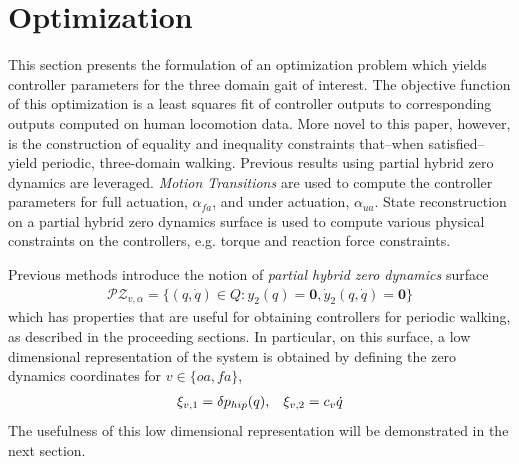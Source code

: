 \section{Optimization}
\label{sec:optimization}

This section presents the formulation of an optimization problem which yields controller parameters for the three domain gait of interest. The objective function of this optimization is a least squares fit of controller outputs to corresponding outputs computed on human locomotion data. More novel to this paper, however, is the construction of equality and inequality constraints that--when satisfied--yield periodic, three-domain walking. Previous results using partial hybrid zero dynamics are leveraged.  \textit{Motion Transitions} \cite{PHA2013} are used to compute the controller parameters for full actuation, $\alpha_{fa}$, and under actuation, $\alpha_{ua}$. State reconstruction on a partial hybrid zero dynamics surface \cite{WGK03} is used to compute various physical constraints on the controllers, e.g. torque and reaction force constraints.


Previous methods introduce the notion of \textit{partial hybrid zero dynamics} surface
\begin{align}
\label{PZD}
\mathcal{PZ}_{v,\alpha} = \{(q,\dot{q}) \in Q : y_{2}(q) = \mathbf{0}, \dot{y}_{2}(q,\dot{q}) = \mathbf{0}\}
\end{align}
which has properties that are useful for obtaining controllers for periodic walking, as described in the proceeding sections. In particular, on this surface, a low dimensional representation of the system is obtained by defining the zero dynamics coordinates for $v \in \{oa,fa\}$,
\begin{align}
\xi_{v,1} = \delta p_{hip}(q), \hspace{3mm}
\xi_{v,2} = c_{v}\dot{q}
\end{align}
The usefulness of this low dimensional representation will be demonstrated in the next section.

